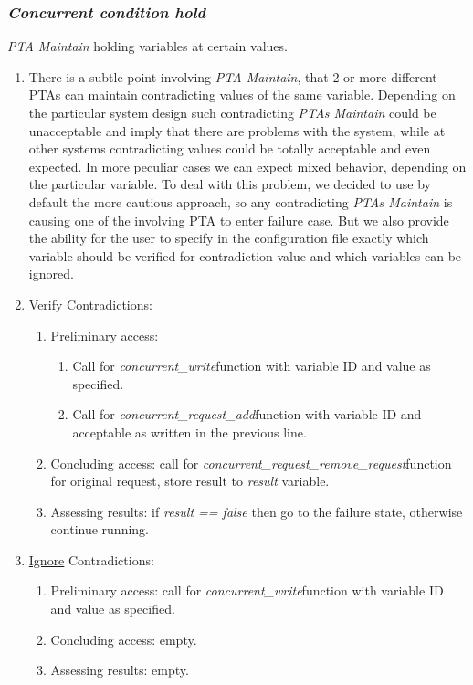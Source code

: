 \subsubsection{\textit{\textit{Concurrent condition} hold} \label{memory_module_applications_concurrent_condition_hold}}
\textit{PTA Maintain} holding variables at certain values.
\begin{enumerate}  
\item There is a subtle point involving \textit{PTA Maintain}, that 2 or more different PTAs can maintain contradicting values of the same variable. Depending on the particular system design such contradicting \textit{PTAs Maintain} could be unacceptable and imply that there are problems with the system, while at other systems contradicting values could be totally acceptable and even expected. In more peculiar cases we can expect mixed behavior, depending on the particular variable. To deal with this problem, we decided to use by default the more cautious approach, so any contradicting \textit{PTAs Maintain} is causing one of the involving PTA to enter failure case. But we also provide the ability for the user to specify in the configuration file exactly which variable should be verified for contradiction value and which variables can be ignored.  
\item \underline{Verify} Contradictions:
\begin{enumerate} 
\item Preliminary access:
\begin{enumerate}  
\item Call for \textcolor{ColorUppaalFunction}{\textit{concurrent_write}}​ function with variable ID and value as specified.  
\item Call for \textcolor{ColorUppaalFunction}{\textit{concurrent_request_add}}​ function with variable ID and acceptable as written in the previous line.
\end{enumerate}  
\item Concluding access: call for \textcolor{ColorUppaalFunction}{\textit{concurrent_request_remove_request}}​ function for original request, store result to \textcolor{ColorEdgeGuard}{\textit{result}} variable.  
\item Assessing results: if \textcolor{ColorEdgeGuard}{\textit{result == false}} then go to the failure state, otherwise continue running.
\end{enumerate}  
\item \underline{Ignore} Contradictions:
\begin{enumerate}  
\item Preliminary access: call for \textcolor{ColorUppaalFunction}{\textit{concurrent_write}}​ function with variable ID and value as specified. 
\item Concluding access: empty. 
\item Assessing results: empty.
\end{enumerate}
\end{enumerate}
